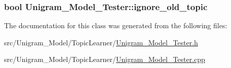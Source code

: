 \label{class_unigram___model___tester_a1c5f61eac028445bec986e4f039351a9}
\hypertarget{class_unigram___model___tester_ae83a2ed8e687c16a8d495e5004555444}{
\subsubsection[{ignore\_\-old\_\-topic}]{\setlength{\rightskip}{0pt plus 5cm}bool {\bf Unigram\_\-Model\_\-Tester::ignore\_\-old\_\-topic}}}
\label{class_unigram___model___tester_ae83a2ed8e687c16a8d495e5004555444}


The documentation for this class was generated from the following files:\begin{DoxyCompactItemize}
\item 
src/Unigram\_\-Model/TopicLearner/\hyperlink{_unigram___model___tester_8h}{Unigram\_\-Model\_\-Tester.h}\item 
src/Unigram\_\-Model/TopicLearner/\hyperlink{_unigram___model___tester_8cpp}{Unigram\_\-Model\_\-Tester.cpp}\end{DoxyCompactItemize}
